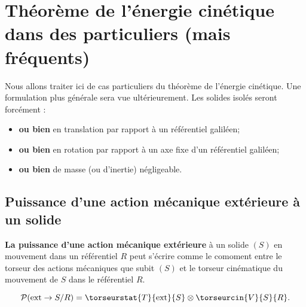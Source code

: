


%
%
\section{Théorème de l'énergie cinétique dans des particuliers (mais fréquents)}

\begin{hypo}
Nous allons traiter ici de cas particuliers du théorème de l'énergie cinétique. Une formulation plus générale sera vue ultérieurement. 
Les solides isolés seront forcément : 
\begin{itemize}
\item \textbf{ou bien} en translation par rapport à un référentiel galiléen;
\item \textbf{ou bien} en rotation par rapport à un axe fixe d'un référentiel galiléen;
\item \textbf{ou bien} de masse (ou d'inertie) négligeable. 
\end{itemize}
\end{hypo}

\subsection{Puissance d'une action mécanique extérieure à un solide}


\begin{defi}

\textbf{La puissance d'une action mécanique extérieure} à un solide $(S)$ en mouvement dans un référentiel $R$ peut s'écrire comme le comoment entre le torseur des actions mécaniques que subit $(S)$ et le torseur cinématique du mouvement de $S$ dans le référentiel $R$.

$$
\mathcal{P}(\text{ext} \rightarrow S/R)=\torseurstat{T}{\text{ext}}{S}\otimes \torseurcin{V}{S}{R}.
$$
\end{defi}



